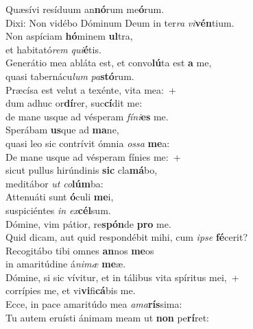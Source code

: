 \evenverse Quæsívi resíduum an\textbf{nó}rum me\textbf{ó}rum.~\*\\
\evenverse Dixi: Non vidébo Dóminum Deum in ter\textit{ra} \textit{vi}\textbf{vén}tium.\\
\oddverse Non aspíciam \textbf{hó}minem \textbf{ul}tra,~\*\\
\oddverse et habitató\textit{rem} \textit{qui}\textbf{é}tis.\\
\evenverse Generátio mea abláta est, et convo\textbf{lú}ta est \textbf{a} me,~\*\\
\evenverse quasi tabernácu\textit{lum} \textit{pa}\textbf{stó}rum.\\
\oddverse Præcísa est velut a texénte, vita mea:~+\\
\oddverse  dum adhuc or\textbf{dí}rer, suc\textbf{cí}dit me:~\*\\
\oddverse de mane usque ad vésperam \textit{fí}\textit{ni}\textbf{es} me.\\
\evenverse Sperábam \textbf{us}que ad \textbf{ma}ne,~\*\\
\evenverse quasi leo sic contrívit ómnia \textit{os}\textit{sa} \textbf{me}a:\\
\oddverse De mane usque ad vésperam fínies me:~+\\
\oddverse  sicut pullus hirúndinis \textbf{sic} cla\textbf{má}bo,~\*\\
\oddverse meditábor \textit{ut} \textit{co}\textbf{lúm}ba:\\
\evenverse Attenuáti sunt \textbf{ó}culi \textbf{me}i,~\*\\
\evenverse suspiciéntes \textit{in} \textit{ex}\textbf{cél}sum.\\
\oddverse Dómine, vim pátior, re\textbf{spón}de \textbf{pro} me.~\*\\
\oddverse Quid dicam, aut quid respondébit mihi, cum \textit{i}\textit{pse} \textbf{fé}cerit?\\
\evenverse Recogitábo tibi omnes \textbf{an}nos \textbf{me}os~\*\\
\evenverse in amaritúdine á\textit{ni}\textit{mæ} \textbf{me}æ.\\
\oddverse Dómine, si sic vívitur, et in tálibus vita spíritus mei,~+\\
\oddverse  corrípies me, et vi\textbf{vi}fi\textbf{cá}bis me.~\*\\
\oddverse Ecce, in pace amaritúdo mea \textit{a}\textit{ma}\textbf{rís}sima:\\
\evenverse Tu autem eruísti ánimam meam ut \textbf{non} pe\textbf{rí}ret:~\*\\
